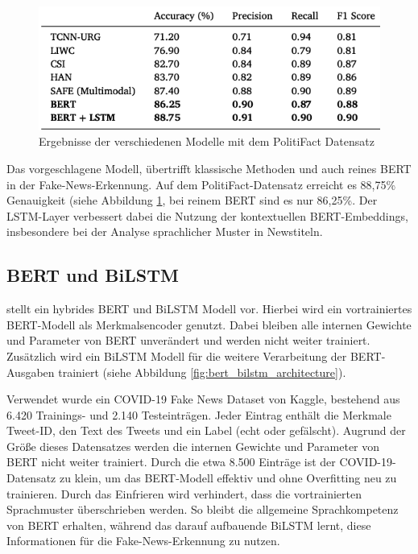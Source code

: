 \begin{figure}[htbp]
    \begin{center}
    \includegraphics[scale=0.5]{static/bert_lstm_politifact.png}
    \caption{\label{fig:bert_lstm_politifact} Ergebnisse der verschiedenen Modelle mit dem PolitiFact Datensatz \cite{RAI202298}}
    \end{center}
\end{figure}

Das vorgeschlagene Modell, übertrifft klassische Methoden und auch reines BERT in der Fake-News-Erkennung. 
Auf dem PolitiFact-Datensatz erreicht es 88,75\% Genauigkeit (siehe Abbildung \ref{fig:bert_lstm_politifact}, bei reinem BERT sind es nur 86,25\%.
Der LSTM-Layer verbessert dabei die Nutzung der kontextuellen BERT-Embeddings, insbesondere bei der Analyse sprachlicher Muster in Newstiteln.

\subsection{BERT und BiLSTM}

\cite{wang2021covid19fakenewsdetection} stellt ein hybrides BERT und BiLSTM Modell vor. Hierbei wird ein vortrainiertes BERT-Modell als 
Merkmalsencoder genutzt. Dabei bleiben alle internen Gewichte und Parameter von BERT unverändert und werden nicht weiter trainiert. 
Zusätzlich wird ein BiLSTM Modell für die weitere Verarbeitung der BERT-Ausgaben trainiert (siehe Abbildung \ref{fig:bert_bilstm_architecture}).

Verwendet wurde ein COVID-19 Fake News Dataset von Kaggle, bestehend aus 6.420 Trainings- und 2.140 Testeinträgen. 
Jeder Eintrag enthält die Merkmale Tweet-ID, den Text des Tweets und ein Label (echt oder gefälscht).
Augrund der Größe dieses Datensatzes werden die internen Gewichte und Parameter von BERT nicht weiter trainiert.
Durch die etwa 8.500 Einträge ist der COVID-19-Datensatz zu klein, um das BERT-Modell effektiv und ohne Overfitting neu zu trainieren.
Durch das Einfrieren wird verhindert, dass die vortrainierten Sprachmuster überschrieben werden. 
So bleibt die allgemeine Sprachkompetenz von BERT erhalten, während das darauf aufbauende BiLSTM lernt, 
diese Informationen für die Fake-News-Erkennung zu nutzen.

